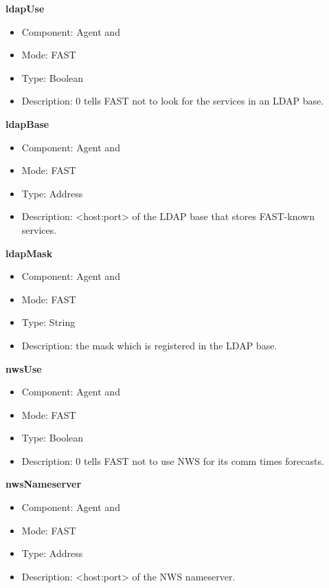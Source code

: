 \begin{description}
\item{\bf{ldapUse}}
  \begin{itemize}
  \item Component: Agent and \sed
  \item Mode: FAST
  \item Type: Boolean
  \item Description: 0 tells FAST not to look for the services in an
    LDAP base.
  \end{itemize}

\item{\bf{ldapBase}}
  \begin{itemize}
  \item Component: Agent and \sed
  \item Mode: FAST
  \item Type: Address 
  \item Description: <host:port> of the LDAP base that stores
    FAST-known services.
  \end{itemize}

\item{\bf{ldapMask}}
  \begin{itemize}
  \item Component: Agent and \sed
  \item Mode: FAST
  \item Type: String
  \item Description: the mask which is registered in the LDAP base.
  \end{itemize}

\item{\bf{nwsUse}}
  \begin{itemize}
  \item Component: Agent and \sed
  \item Mode: FAST
  \item Type: Boolean
  \item Description: 0 tells FAST not to use NWS for its comm times
    forecasts.
  \end{itemize}

\item{\bf{nwsNameserver}}
  \begin{itemize}
  \item Component: Agent and \sed
  \item Mode: FAST
  \item Type: Address
  \item Description: <host:port> of the NWS nameserver.
  \end{itemize}


\end{description}
